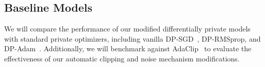 \begin{table}[!ht]
    \caption{Experimental Design}  %
    \centering  %
    \label{tab:doe}  %
\end{table}

\subsection{Baseline Models}\label{subsec:baseline-models}
We will compare the performance of our modified differentially private models with standard private optimizers,
including vanilla DP-SGD~\cite{Abadi_2016_DeepLearningDifferentialPrivacy}, DP-RMSprop,
and DP-Adam~\cite{zhou_2020_private_adaptive_algorithms}.
Additionally, we will benchmark against AdaClip~\cite{adaClip_2019} to evaluate the effectiveness of our automatic
clipping and noise mechanism modifications.